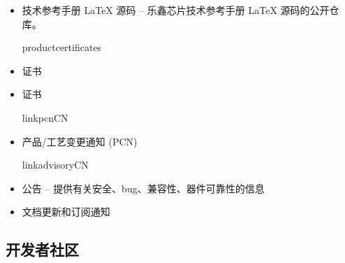 {\begin{minipage}{\textwidth}
\begin{itemize}
  \ifcsname linktrmlatexsourcerepo\endcsname%
    \item 技术参考手册 LaTeX 源码 --
        {\small 乐鑫芯片技术参考手册 LaTeX 源码的公开仓库。}\\
        \href{\linkprefix\linktrmlatexsourcerepo}{\linkprefix\linktrmlatexsourcerepo}
  \fi%

  \ifcsname productcertificates\endcsname%
    \item 证书\\
        \href{\linkprefix\linkcertificatesCN\productcertificates}{\linkprefix\linkcertificatesCN}
  \else
    \item 证书\\
        \href{\linkprefix\linkcertificatesCN}{\linkprefix\linkcertificatesCN}
  \fi%

  \ifcsname linkpcnCN\endcsname%
    \item \chipseries{} 产品/工艺变更通知 (PCN)\\
        \href{\linkprefix\linkpcnCN}{\linkprefix\linkpcnCN}
  \fi%

  \ifcsname linkadvisoryCN\endcsname%
    \item \chipseries{} 公告 --
        {\small 提供有关安全、bug、兼容性、器件可靠性的信息}\\
        \href{\linkprefix\linkadvisoryCN}{\linkprefix\linkadvisoryCN}
  \fi%

    \item 文档更新和订阅通知\\
        \href{\linkprefix\linkrecentlyupdatedCN}{\linkprefix\linkrecentlyupdatedCN}

\end{itemize}

\end{minipage}



\begin{minipage}{\textwidth}

\subsection*{开发者社区}


\end{minipage}}
